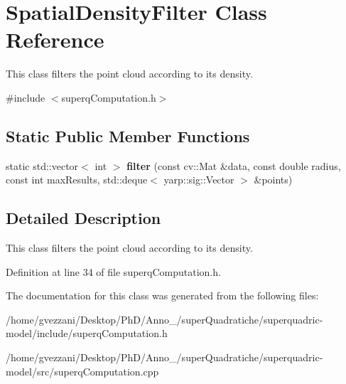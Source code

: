 \section{Spatial\-Density\-Filter Class Reference}
\label{classSpatialDensityFilter}


This class filters the point cloud according to its density.  




{\ttfamily \#include $<$superq\-Computation.\-h$>$}

\subsection*{Static Public Member Functions}
\begin{DoxyCompactItemize}
\item 
static std\-::vector$<$ int $>$ {\bfseries filter} (const cv\-::\-Mat \&data, const double radius, const int max\-Results, std\-::deque$<$ yarp\-::sig\-::\-Vector $>$ \&points)\label{classSpatialDensityFilter_a85931f42a6e96af8c7f331fbd01c15bf}

\end{DoxyCompactItemize}


\subsection{Detailed Description}
This class filters the point cloud according to its density. 

Definition at line 34 of file superq\-Computation.\-h.



The documentation for this class was generated from the following files\-:\begin{DoxyCompactItemize}
\item 
/home/gvezzani/\-Desktop/\-Ph\-D/\-Anno\-\_/super\-Quadratiche/superquadric-\/model/include/superq\-Computation.\-h\item 
/home/gvezzani/\-Desktop/\-Ph\-D/\-Anno\-\_/super\-Quadratiche/superquadric-\/model/src/superq\-Computation.\-cpp\end{DoxyCompactItemize}
